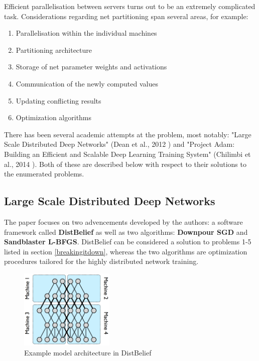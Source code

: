 \documentclass[a4paper, 12pt]{article}
\numberwithin{equation}{section}
\begin{document}
	Efficient parallelisation between servers turns out to be an extremely complicated task. Considerations regarding net partitioning span several areas, for example:
	\begin{enumerate}
		\item Parallelisation within the individual machines
		\item Partitioning architecture
		\item Storage of net parameter weights and activations
		\item Communication of the newly computed values
		\item Updating conflicting results
		\item Optimization algorithms
	\end{enumerate}
	
	There has been several academic attempts at the problem, most notably: "Large Scale Distributed Deep Networks" (Dean et al., 2012 \cite{dean2012large}) and "Project Adam: Building an Efficient and Scalable Deep Learning Training System" (Chilimbi et al., 2014 \cite{chilimbi2014project}). Both of these are described below with respect to their solutions to the enumerated problems.
	
	\subsection{Large Scale Distributed Deep Networks}
	
	The paper focuses on two advencements developed by the authors: a software framework called \textbf{DistBelief} as well as two algorithms: \textbf{Downpour SGD} and \textbf{Sandblaster L-BFGS}. DistBelief can be considered a solution to problems 1-5 listed in section \ref{breakingitdown}, whereas the two algorithms are optimization procedures tailored for the highly distributed network training.
	
	\begin{figure}[H]
		\centering
		\includegraphics[width=0.40\textwidth]{distbelief.png}
		\caption{\label{fig:distbelief}Example model architecture in DistBelief \cite{dean2012large}}
	\end{figure}
	
\end{document}
